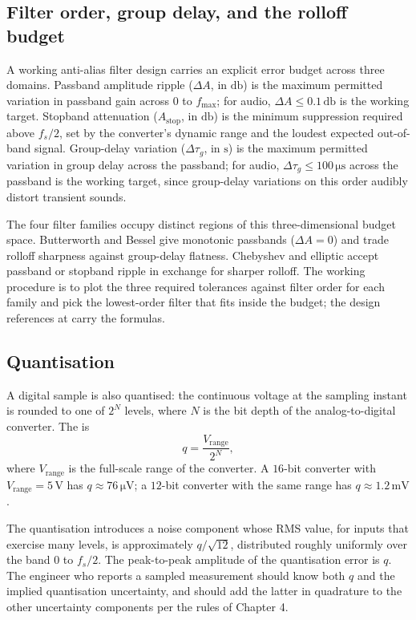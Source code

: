 \subsection{Filter order, group delay, and the rolloff budget}

A working anti-alias filter design carries an explicit error
budget across three domains. Passband amplitude ripple ($\Delta A$,
in $\si{\decibel}$) is the maximum permitted variation in passband
gain across $0$ to $f_{\text{max}}$; for audio, $\Delta A \leq
0.1 \,\si{\decibel}$ is the working target. Stopband attenuation
($A_{\text{stop}}$, in $\si{\decibel}$) is the minimum suppression
required above $f_{s}/2$, set by the converter's dynamic range and
the loudest expected out-of-band signal. Group-delay variation
($\Delta \tau_{g}$, in $\si{\second}$) is the maximum permitted
variation in group delay across the passband; for audio,
$\Delta \tau_{g} \leq 100 \,\si{\micro\second}$ across the
passband is the working target, since group-delay variations on
this order audibly distort transient sounds.

The four filter families occupy distinct regions of this
three-dimensional budget space. Butterworth and Bessel give
monotonic passbands ($\Delta A = 0$) and trade rolloff sharpness
against group-delay flatness. Chebyshev and elliptic accept
passband or stopband ripple in exchange for sharper rolloff. The
working procedure is to plot the three required tolerances against
filter order for each family and pick the lowest-order filter
that fits inside the budget; the design references at
\cite{text:ch06t3-williams-electronic-filter-2006} carry the
formulas.

\subsection{Quantisation}

A digital sample is also quantised: the continuous voltage at the
sampling instant is rounded to one of $2^{N}$ levels, where $N$ is
the bit depth of the analog-to-digital converter. The
 is
\[
q = \frac{V_{\text{range}}}{2^{N}},
\]
where $V_{\text{range}}$ is the full-scale range of the converter.
A $16$-bit converter with $V_{\text{range}} = 5 \,\si{\volt}$ has
$q \approx 76 \,\si{\micro\volt}$; a $12$-bit converter with the
same range has $q \approx 1.2 \,\si{\milli\volt}$.

The quantisation introduces a noise component whose RMS value, for
inputs that exercise many levels, is approximately
$q / \sqrt{12}$, distributed roughly uniformly over the band $0$ to
$f_{s}/2$. The peak-to-peak amplitude of the quantisation error is
$q$. The engineer who reports a sampled measurement should know
both $q$ and the implied quantisation uncertainty, and should add
the latter in quadrature to the other uncertainty components per
the rules of Chapter 4.

